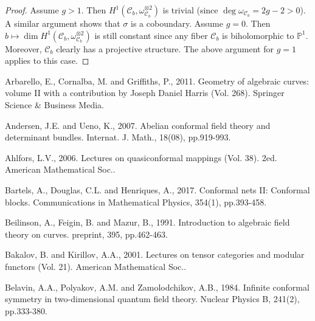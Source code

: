 \documentclass[11pt,b5paper,notitlepage]{article}
\theoremstyle{definition}
\theoremstyle{plain}
\newcommand{\mc}{\mathcal}
\newcommand{\Pbb}{\mathbb P}
\numberwithin{equation}{section}
\begin{document}
\begin{proof}
Assume $g>1$. Then $H^1(\mc C_b,\omega_{\mc C_b}^{\otimes 2})$ is trivial (since $\deg\omega_{\mc C_b}=2g-2>0$). A similar argument  shows that $\sigma$ is a coboundary. Assume $g=0$. Then $b\mapsto \dim H^1(\mc C_b,\omega_{\mc C_b}^{\otimes 2})$ is still constant since any fiber $\mc C_b$ is biholomorphic to $\Pbb^1$. Moreover, $\mc C_b$ clearly has a projective structure.  The above argument for $g=1$ applies to this case. 
\end{proof}












	\printindex
	
	\newpage
	
	\begin{thebibliography}{999999}
		\footnotesize	
		
		
		
		
		
		Arbarello, E., Cornalba, M. and Griffiths, P., 2011. Geometry of algebraic curves: volume II with a contribution by Joseph Daniel Harris (Vol. 268). Springer Science \& Business Media.
		
Andersen, J.E. and Ueno, K., 2007. Abelian conformal field theory and determinant bundles. Internat. J.  Math., 18(08), pp.919-993.



Ahlfors, L.V., 2006. Lectures on quasiconformal mappings (Vol. 38). 2ed. American Mathematical Soc..


Bartels, A., Douglas, C.L. and Henriques, A., 2017. Conformal nets II: Conformal blocks. Communications in Mathematical Physics, 354(1), pp.393-458.

Beilinson, A., Feigin, B. and Mazur, B., 1991. Introduction to algebraic field theory on curves. preprint, 395, pp.462-463.

Bakalov, B. and Kirillov, A.A., 2001. Lectures on tensor categories and modular functors (Vol. 21). American Mathematical Soc..


Belavin, A.A., Polyakov, A.M. and Zamolodchikov, A.B., 1984. Infinite conformal symmetry in two-dimensional quantum field theory. Nuclear Physics B, 241(2), pp.333-380.
		

\end{thebibliography}
\end{document}
